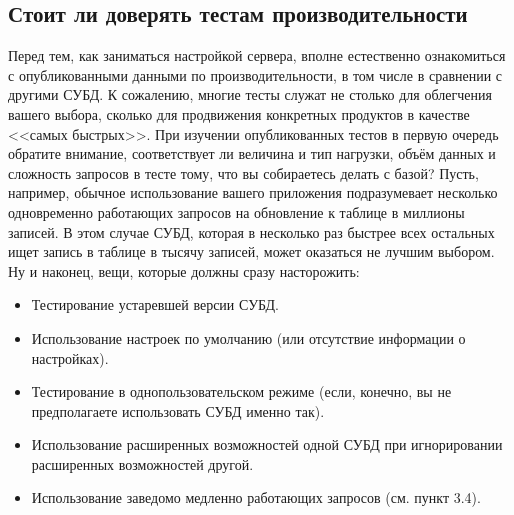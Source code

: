 \subsection{Стоит ли доверять тестам производительности}
Перед тем, как заниматься настройкой сервера, вполне естественно ознакомиться с опубликованными данными по 
производительности, в том числе в сравнении с другими СУБД. К сожалению, многие тесты служат не столько для 
облегчения вашего выбора, сколько для продвижения конкретных продуктов в качестве <<самых быстрых>>.
При изучении опубликованных тестов в первую очередь обратите внимание, соответствует ли величина и тип 
нагрузки, объём данных и сложность запросов в тесте тому, что вы собираетесь делать с базой? Пусть, например, 
обычное использование вашего приложения подразумевает несколько одновременно работающих 
запросов на обновление к таблице в миллионы записей. В этом случае СУБД, которая в несколько раз 
быстрее всех остальных ищет запись в таблице в тысячу записей, может оказаться не лучшим выбором.
Ну и наконец, вещи, которые должны сразу насторожить:
\begin{itemize}
\item Тестирование устаревшей версии СУБД.
\item Использование настроек по умолчанию (или отсутствие информации о настройках).
\item Тестирование в однопользовательском режиме (если, конечно, вы не предполагаете использовать СУБД именно так).
\item Использование расширенных возможностей одной СУБД при игнорировании расширенных возможностей другой.
\item  Использование заведомо медленно работающих запросов (см. пункт 3.4).
\end{itemize}

